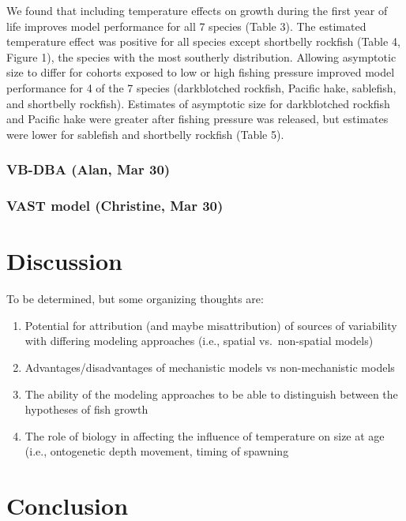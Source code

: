 \documentclass[
]{article}
\begin{document}
We found that including temperature effects on growth during the first
year of life improves model performance for all 7 species (Table 3). The
estimated temperature effect was positive for all species except
shortbelly rockfish (Table 4, Figure 1), the species with the most
southerly distribution. Allowing asymptotic size to differ for cohorts
exposed to low or high fishing pressure improved model performance for 4
of the 7 species (darkblotched rockfish, Pacific hake, sablefish, and
shortbelly rockfish). Estimates of asymptotic size for darkblotched
rockfish and Pacific hake were greater after fishing pressure was
released, but estimates were lower for sablefish and shortbelly rockfish
(Table 5).

\hypertarget{vb-dba-alan-mar-30}{%
\subsubsection{VB-DBA (Alan, Mar 30)}\label{vb-dba-alan-mar-30}}

\hypertarget{vast-model-christine-mar-30}{%
\subsubsection{VAST model (Christine, Mar
30)}\label{vast-model-christine-mar-30}}

\hypertarget{discussion}{%
\section{Discussion}\label{discussion}}

To be determined, but some organizing thoughts are:

\begin{enumerate}
\def\labelenumi{\arabic{enumi})}
\item
  Potential for attribution (and maybe misattribution) of sources of
  variability with differing modeling approaches (i.e., spatial
  vs.~non-spatial models)
\item
  Advantages/disadvantages of mechanistic models vs non-mechanistic
  models
\item
  The ability of the modeling approaches to be able to distinguish
  between the hypotheses of fish growth
\item
  The role of biology in affecting the influence of temperature on size
  at age (i.e., ontogenetic depth movement, timing of spawning
\end{enumerate}

\hypertarget{conclusion}{%
\section{Conclusion}\label{conclusion}}
\end{document}
